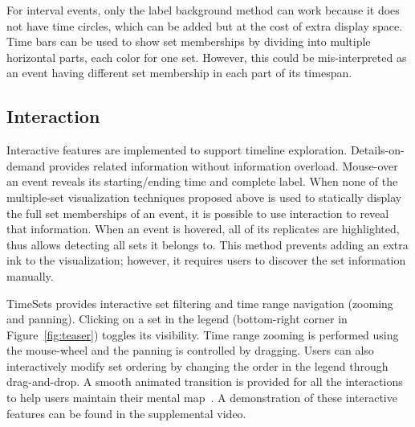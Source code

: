 For interval events, only the label background method can work because it does not have time circles, which can be added but at the cost of extra display space. Time bars can be used to show set memberships by dividing into multiple horizontal parts, each color for one set. However, this could be mis-interpreted as an event having different set membership in each part of its timespan.

\subsection{Interaction}
\label{sub:interaction}
Interactive features are implemented to support timeline exploration. Details-on-demand provides related information without information overload. Mouse-over an event reveals its starting/ending time and complete label. When none of the multiple-set visualization techniques proposed above is used to statically display the full set memberships of an event, it is possible to use interaction to reveal that information. When an event is hovered, all of its replicates are highlighted, thus allows detecting all sets it belongs to. This method prevents adding an extra ink to the visualization; however, it requires users to discover the set information manually. 

TimeSets provides interactive set filtering and time range navigation (zooming and panning). Clicking on a set in the legend (bottom-right corner in Figure~\ref{fig:teaser}) toggles its visibility. Time range zooming is performed using the mouse-wheel and the panning is controlled by dragging. Users can also interactively modify set ordering by changing the order in the legend through drag-and-drop. A smooth animated transition is provided for all the interactions to help users maintain their mental map~\cite{Elmqvist2011}. A demonstration of these interactive features can be found in the supplemental video.